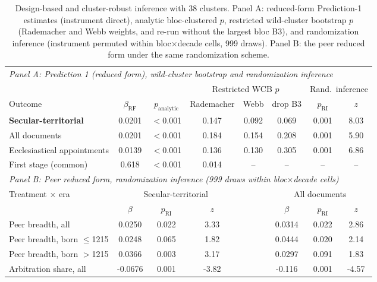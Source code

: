 \documentclass[12pt]{article}
\theoremstyle{definition}
\theoremstyle{remark}
\begin{document}
\begin{table}[t]
\centering
\caption{Design-based and cluster-robust inference with 38 clusters. Panel A: reduced-form Prediction-1 estimates (instrument direct), analytic bloc-clustered $p$, restricted wild-cluster bootstrap $p$ (Rademacher and Webb weights, and re-run without the largest bloc B3), and randomization inference (instrument permuted within bloc$\times$decade cells, 999 draws). Panel B: the peer reduced form under the same randomization scheme.}
\label{tab:app_inference}
{\footnotesize\setlength{\tabcolsep}{4pt}
\begin{tabular}{lccccccc}
\toprule
\multicolumn{8}{l}{\textit{Panel A: Prediction 1 (reduced form), wild-cluster bootstrap and randomization inference}} \\
\addlinespace
 & & & \multicolumn{3}{c}{Restricted WCB $p$} & \multicolumn{2}{c}{Rand.\ inference} \\
\cmidrule(lr){4-6}\cmidrule(lr){7-8}
Outcome & $\beta_{\text{RF}}$ & $p_{\text{analytic}}$ & Rademacher & Webb & drop B3 & $p_{\text{RI}}$ & $z$ \\
\midrule
\textbf{Secular-territorial} & 0.0201 & $<$0.001 & 0.147 & 0.092 & 0.069 & 0.001 & 8.03 \\
All documents & 0.0201 & $<$0.001 & 0.184 & 0.154 & 0.208 & 0.001 & 5.90 \\
Ecclesiastical appointments & 0.0139 & $<$0.001 & 0.136 & 0.130 & 0.305 & 0.001 & 6.86 \\
First stage (common) & 0.618 & $<$0.001 & 0.014 & -- & -- & -- & -- \\
\midrule
\multicolumn{8}{l}{\textit{Panel B: Peer reduced form, randomization inference (999 draws within bloc$\times$decade cells)}} \\
\addlinespace
Treatment $\times$ era & \multicolumn{3}{c}{Secular-territorial} & & \multicolumn{3}{c}{All documents} \\
 & $\beta$ & $p_{\text{RI}}$ & $z$ & & $\beta$ & $p_{\text{RI}}$ & $z$ \\
\midrule
Peer breadth, all & 0.0250 & 0.022 & 3.33 & & 0.0314 & 0.022 & 2.86 \\
Peer breadth, born $\leq$1215 & 0.0248 & 0.065 & 1.82 & & 0.0444 & 0.020 & 2.14 \\
Peer breadth, born $>$1215 & 0.0366 & 0.003 & 3.17 & & 0.0297 & 0.091 & 1.83 \\
Arbitration share, all & -0.0676 & 0.001 & -3.82 & & -0.116 & 0.001 & -4.57 \\

\end{tabular}}
\end{table}
\end{document}
